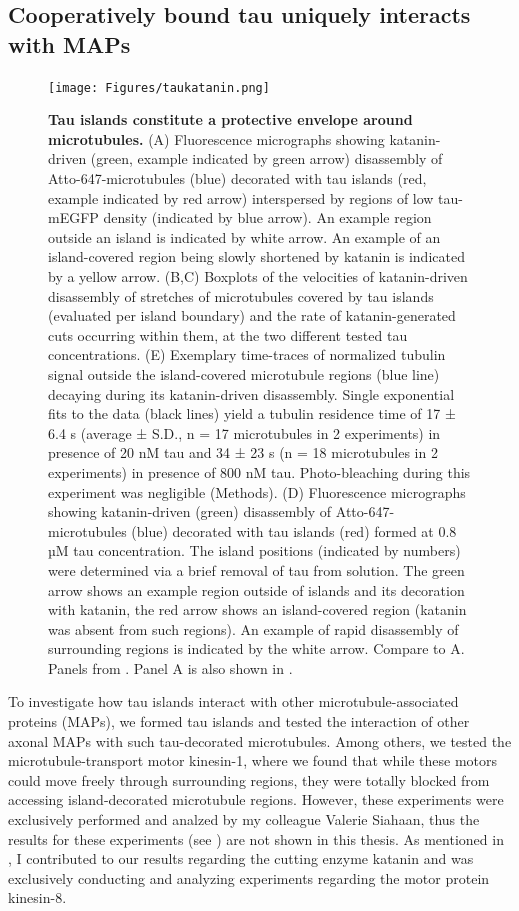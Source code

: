 \FloatBarrier
\subsection{Cooperatively bound tau uniquely interacts with MAPs}
\begin{figure}[h!]
\centering
\texttt{[image: Figures/taukatanin.png]}
\caption[Tau islands constitute a protective envelope around microtubules.]{
\textbf{Tau islands constitute a protective envelope around microtubules.} (A) Fluorescence micrographs showing katanin-driven (green, example indicated by green arrow) disassembly of Atto-647-microtubules (blue) decorated with tau islands (red, example indicated by red arrow) interspersed by regions of low tau-mEGFP density (indicated by blue arrow). An example region outside an island is indicated by white arrow. An example of an island-covered region being slowly shortened by katanin is indicated by a yellow arrow. (B,C) Boxplots of the velocities of katanin-driven disassembly of stretches of microtubules covered by tau islands (evaluated per island boundary) and the rate of katanin-generated cuts occurring within them, at the two different tested tau concentrations. (E) Exemplary time-traces of normalized tubulin signal outside the island-covered microtubule regions (blue line) decaying during its katanin-driven disassembly. Single exponential fits to the data (black lines) yield a tubulin residence time of 17 ± 6.4 s (average ± S.D., n = 17 microtubules in 2 experiments) in presence of 20 nM tau and 34 ± 23 s (n = 18 microtubules in 2 experiments) in presence of 800 nM tau. Photo-bleaching during this experiment was negligible (Methods). (D) Fluorescence micrographs showing katanin-driven (green) disassembly of Atto-647-microtubules (blue) decorated with tau islands (red) formed at 0.8 µM tau concentration. The island positions (indicated by numbers) were determined via a brief removal of tau from solution. The green arrow shows an example region outside of islands and its decoration with katanin, the red arrow shows an island-covered region (katanin was absent from such regions). An example of rapid disassembly of surrounding regions is indicated by the white arrow. Compare to A. Panels from \cite{Siahaan2019a}. Panel A is also shown in \cite{Siahaan}.
	}\label{taukatanin}
\end{figure}
To investigate how tau islands interact with other microtubule-associated proteins (MAPs), we formed tau islands and tested the interaction of other axonal MAPs with such tau-decorated microtubules. Among others, we tested the microtubule-transport motor kinesin-1, where we found that while these motors could move freely through surrounding regions, they were totally blocked from accessing island-decorated microtubule regions. However, these experiments were exclusively performed and analzed by my colleague Valerie Siahaan, thus the results for these experiments (see \cite{Siahaan2019a}) are not shown in this thesis. As mentioned in , I contributed to our results regarding the cutting enzyme katanin and was exclusively conducting and analyzing experiments regarding the motor protein kinesin-8.\par

